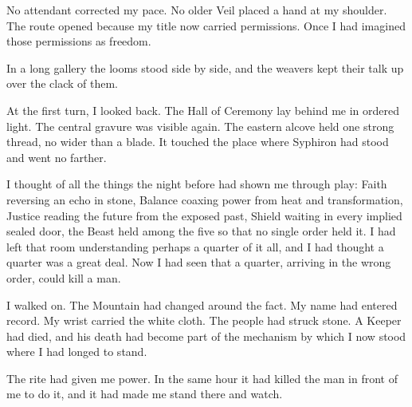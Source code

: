 No attendant corrected my pace.
No older Veil placed a hand at my shoulder.
The route opened because my title now carried permissions. Once I had imagined those permissions as freedom.\par
In a long gallery the looms stood side by side, and the weavers kept their talk up over the clack of them.\par
At the first turn, I looked back.
The Hall of Ceremony lay behind me in ordered light.
The central gravure was visible again.
The eastern alcove held one strong thread, no wider than a blade.
It touched the place where Syphiron had stood and went no farther.\par
I thought of all the things the night before had shown me through play: Faith reversing an echo in stone, Balance coaxing power from heat and transformation, Justice reading the future from the exposed past, Shield waiting in every implied sealed door, the Beast held among the five so that no single order held it.
I had left that room understanding perhaps a quarter of it all, and I had thought a quarter was a great deal.
Now I had seen that a quarter, arriving in the wrong order, could kill a man.\par
I walked on.
The Mountain had changed around the fact.
My name had entered record.
My wrist carried the white cloth.
The people had struck stone.
A Keeper had died, and his death had become part of the mechanism by which I now stood where I had longed to stand.\par
The rite had given me power. In the same hour it had killed the man in front of me to do it, and it had made me stand there and watch.\par

\ornament
